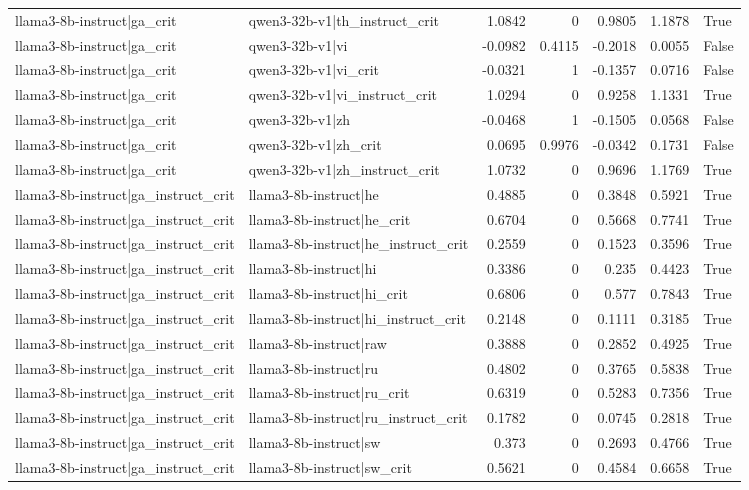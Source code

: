 \begin{table}
\begin{tabular}{l l r r r r l}
llama3-8b-instruct|ga_crit & qwen3-32b-v1|th_instruct_crit & 1.0842 & 0 & 0.9805 & 1.1878 & True \\
llama3-8b-instruct|ga_crit & qwen3-32b-v1|vi & -0.0982 & 0.4115 & -0.2018 & 0.0055 & False \\
llama3-8b-instruct|ga_crit & qwen3-32b-v1|vi_crit & -0.0321 & 1 & -0.1357 & 0.0716 & False \\
llama3-8b-instruct|ga_crit & qwen3-32b-v1|vi_instruct_crit & 1.0294 & 0 & 0.9258 & 1.1331 & True \\
llama3-8b-instruct|ga_crit & qwen3-32b-v1|zh & -0.0468 & 1 & -0.1505 & 0.0568 & False \\
llama3-8b-instruct|ga_crit & qwen3-32b-v1|zh_crit & 0.0695 & 0.9976 & -0.0342 & 0.1731 & False \\
llama3-8b-instruct|ga_crit & qwen3-32b-v1|zh_instruct_crit & 1.0732 & 0 & 0.9696 & 1.1769 & True \\
llama3-8b-instruct|ga_instruct_crit & llama3-8b-instruct|he & 0.4885 & 0 & 0.3848 & 0.5921 & True \\
llama3-8b-instruct|ga_instruct_crit & llama3-8b-instruct|he_crit & 0.6704 & 0 & 0.5668 & 0.7741 & True \\
llama3-8b-instruct|ga_instruct_crit & llama3-8b-instruct|he_instruct_crit & 0.2559 & 0 & 0.1523 & 0.3596 & True \\
llama3-8b-instruct|ga_instruct_crit & llama3-8b-instruct|hi & 0.3386 & 0 & 0.235 & 0.4423 & True \\
llama3-8b-instruct|ga_instruct_crit & llama3-8b-instruct|hi_crit & 0.6806 & 0 & 0.577 & 0.7843 & True \\
llama3-8b-instruct|ga_instruct_crit & llama3-8b-instruct|hi_instruct_crit & 0.2148 & 0 & 0.1111 & 0.3185 & True \\
llama3-8b-instruct|ga_instruct_crit & llama3-8b-instruct|raw & 0.3888 & 0 & 0.2852 & 0.4925 & True \\
llama3-8b-instruct|ga_instruct_crit & llama3-8b-instruct|ru & 0.4802 & 0 & 0.3765 & 0.5838 & True \\
llama3-8b-instruct|ga_instruct_crit & llama3-8b-instruct|ru_crit & 0.6319 & 0 & 0.5283 & 0.7356 & True \\
llama3-8b-instruct|ga_instruct_crit & llama3-8b-instruct|ru_instruct_crit & 0.1782 & 0 & 0.0745 & 0.2818 & True \\
llama3-8b-instruct|ga_instruct_crit & llama3-8b-instruct|sw & 0.373 & 0 & 0.2693 & 0.4766 & True \\
llama3-8b-instruct|ga_instruct_crit & llama3-8b-instruct|sw_crit & 0.5621 & 0 & 0.4584 & 0.6658 & True \\

\end{tabular}
\end{table}
